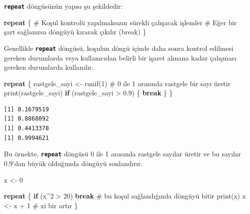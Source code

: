 \documentclass[
  letterpaper,
  DIV=11,
  numbers=noendperiod]{scrreprt}
\newenvironment{Shaded}{\begin{snugshade}}{\end{snugshade}}
\newcommand{\CommentTok}[1]{\textcolor[rgb]{0.37,0.37,0.37}{#1}}
\newcommand{\ControlFlowTok}[1]{\textcolor[rgb]{0.00,0.23,0.31}{\textbf{#1}}}
\newcommand{\DecValTok}[1]{\textcolor[rgb]{0.68,0.00,0.00}{#1}}
\newcommand{\FloatTok}[1]{\textcolor[rgb]{0.68,0.00,0.00}{#1}}
\newcommand{\FunctionTok}[1]{\textcolor[rgb]{0.28,0.35,0.67}{#1}}
\newcommand{\NormalTok}[1]{\textcolor[rgb]{0.00,0.23,0.31}{#1}}
\newcommand{\OtherTok}[1]{\textcolor[rgb]{0.00,0.23,0.31}{#1}}
\newcommand{\SpecialCharTok}[1]{\textcolor[rgb]{0.37,0.37,0.37}{#1}}
\begin{document}
\textbf{\texttt{repeat}} döngüsünün yapısı şu şekildedir:

\begin{Shaded}
\begin{Highlighting}[]
\ControlFlowTok{repeat}\NormalTok{ \{}
  \CommentTok{\# Koşul kontrolü yapılmaksızın sürekli çalışacak işlemler}
  \CommentTok{\# Eğer bir şart sağlanırsa döngüyü kırarak çıkılır (break)}
\NormalTok{\}}
\end{Highlighting}
\end{Shaded}

Genellikle \textbf{\texttt{repeat}} döngüsü, koşulun döngü içinde daha
sonra kontrol edilmesi gereken durumlarda veya kullanıcıdan belirli bir
işaret alınana kadar çalışması gereken durumlarda kullanılır.

\begin{Shaded}
\begin{Highlighting}[]
\ControlFlowTok{repeat}\NormalTok{ \{}
\NormalTok{  rastgele\_sayi }\OtherTok{\textless{}{-}} \FunctionTok{runif}\NormalTok{(}\DecValTok{1}\NormalTok{)  }\CommentTok{\# 0 ile 1 arasında rastgele bir sayı üretir}
  \FunctionTok{print}\NormalTok{(rastgele\_sayi)}
  \ControlFlowTok{if}\NormalTok{ (rastgele\_sayi }\SpecialCharTok{\textgreater{}} \FloatTok{0.9}\NormalTok{) \{}
    \ControlFlowTok{break}
\NormalTok{  \}}
\NormalTok{\}}
\end{Highlighting}
\end{Shaded}

\begin{verbatim}
[1] 0.1679519
[1] 0.8868092
[1] 0.4413378
[1] 0.9994621
\end{verbatim}

Bu örnekte, \textbf{\texttt{repeat}} döngüsü 0 ile 1 arasında rastgele
sayılar üretir ve bu sayılar 0.9'dan büyük olduğunda döngüyü
sonlandırır.

\begin{Shaded}
\begin{Highlighting}[]
\NormalTok{x }\OtherTok{\textless{}{-}} \DecValTok{0}

\ControlFlowTok{repeat}\NormalTok{ \{}
    \ControlFlowTok{if}\NormalTok{ (x}\SpecialCharTok{\^{}}\DecValTok{2} \SpecialCharTok{\textgreater{}} \DecValTok{20}\NormalTok{) }\ControlFlowTok{break}     \CommentTok{\# bu koşul sağlandığında döngüyü bitir}
    \FunctionTok{print}\NormalTok{(x)               }
\NormalTok{    x }\OtherTok{\textless{}{-}}\NormalTok{ x }\SpecialCharTok{+} \DecValTok{1}              \CommentTok{\# x\textquotesingle{}i bir artır}
\NormalTok{\}}
\end{Highlighting}
\end{Shaded}
\end{document}
